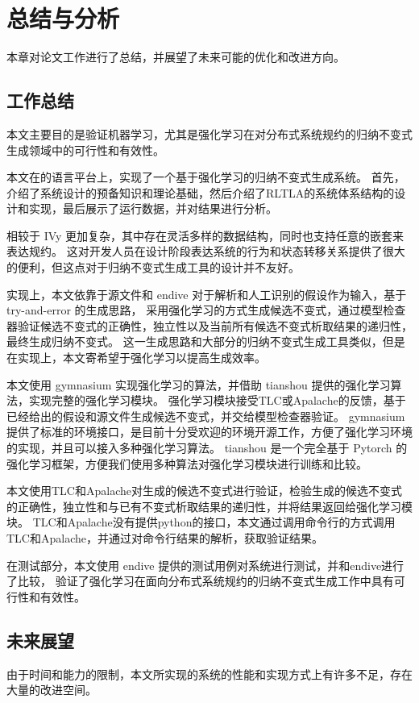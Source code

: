 \chapter{总结与分析}\label{chap:conclusion}
本章对论文工作进行了总结，并展望了未来可能的优化和改进方向。
\section{工作总结}
本文主要目的是验证机器学习，尤其是强化学习在对分布式系统规约的归纳不变式生成领域中的可行性和有效性。

本文在\TLA 的语言平台上，实现了一个基于强化学习的归纳不变式生成系统。
首先，介绍了系统设计的预备知识和理论基础，然后介绍了RLTLA的系统体系结构的设计和实现，最后展示了运行数据，并对结果进行分析。

\TLA 相较于 IVy 更加复杂，其中存在灵活多样的数据结构，同时也支持任意的嵌套来表达规约。
这对开发人员在设计阶段表达系统的行为和状态转移关系提供了很大的便利，但这点对于归纳不变式生成工具的设计并不友好。

实现上，本文依靠于\TLA 源文件和 endive 对于\TLA 解析和人工识别的假设作为输入，基于 try-and-error 的生成思路，
采用强化学习的方式生成候选不变式，通过模型检查器验证候选不变式的正确性，独立性以及当前所有候选不变式析取结果的递归性，最终生成归纳不变式。
这一生成思路和大部分的归纳不变式生成工具类似，但是在实现上，本文寄希望于强化学习以提高生成效率。

本文使用 gymnasium 实现强化学习的算法，并借助 tianshou 提供的强化学习算法，实现完整的强化学习模块。
强化学习模块接受TLC或Apalache的反馈，基于已经给出的假设和\TLA 源文件生成候选不变式，并交给模型检查器验证。
gymnasium 提供了标准的环境接口，是目前十分受欢迎的环境开源工作，方便了强化学习环境的实现，并且可以接入多种强化学习算法。
tianshou 是一个完全基于 Pytorch 的强化学习框架，方便我们使用多种算法对强化学习模块进行训练和比较。

本文使用TLC和Apalache对生成的候选不变式进行验证，检验生成的候选不变式的正确性，独立性和与已有不变式析取结果的递归性，并将结果返回给强化学习模块。
TLC和Apalache没有提供python的接口，本文通过调用命令行的方式调用TLC和Apalache，并通过对命令行结果的解析，获取验证结果。

在测试部分，本文使用 endive 提供的测试用例对系统进行测试，并和endive进行了比较，
验证了强化学习在面向分布式系统规约的归纳不变式生成工作中具有可行性和有效性。

\section{未来展望}
由于时间和能力的限制，本文所实现的系统的性能和实现方式上有许多不足，存在大量的改进空间。

